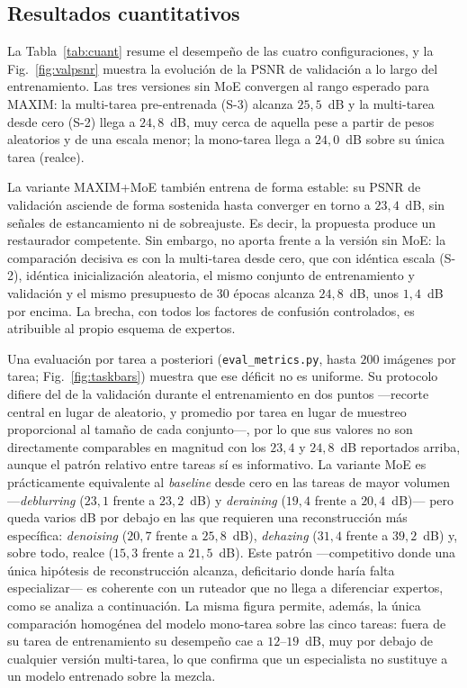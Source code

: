 \documentclass[aps,prl,twocolumn,groupedaddress]{revtex4-2}
\begin{document}
\subsection{Resultados cuantitativos}

La Tabla~\ref{tab:cuant} resume el desempeño de las cuatro configuraciones, y la Fig.~\ref{fig:valpsnr} muestra la evolución de la PSNR de validación a lo largo del entrenamiento. Las tres versiones sin MoE convergen al rango esperado para MAXIM: la multi-tarea pre-entrenada (S-3) alcanza $25{,}5$~dB y la multi-tarea desde cero (S-2) llega a $24{,}8$~dB, muy cerca de aquella pese a partir de pesos aleatorios y de una escala menor; la mono-tarea llega a $24{,}0$~dB sobre su única tarea (realce).

La variante MAXIM+MoE también entrena de forma estable: su PSNR de validación asciende de forma sostenida hasta converger en torno a $23{,}4$~dB, sin señales de estancamiento ni de sobreajuste. Es decir, la propuesta produce un restaurador competente. Sin embargo, no aporta frente a la versión sin MoE: la comparación decisiva es con la multi-tarea desde cero, que con idéntica escala (S-2), idéntica inicialización aleatoria, el mismo conjunto de entrenamiento y validación y el mismo presupuesto de $30$ épocas alcanza $24{,}8$~dB, unos $1{,}4$~dB por encima. La brecha, con todos los factores de confusión controlados, es atribuible al propio esquema de expertos.

Una evaluación por tarea a posteriori (\texttt{eval\_metrics.py}, hasta $200$ imágenes por tarea; Fig.~\ref{fig:taskbars}) muestra que ese déficit no es uniforme. Su protocolo difiere del de la validación durante el entrenamiento en dos puntos ---recorte central en lugar de aleatorio, y promedio por tarea en lugar de muestreo proporcional al tamaño de cada conjunto---, por lo que sus valores no son directamente comparables en magnitud con los $23{,}4$ y $24{,}8$~dB reportados arriba, aunque el patrón relativo entre tareas sí es informativo. La variante MoE es prácticamente equivalente al \textit{baseline} desde cero en las tareas de mayor volumen ---\textit{deblurring} ($23{,}1$ frente a $23{,}2$~dB) y \textit{deraining} ($19{,}4$ frente a $20{,}4$~dB)--- pero queda varios dB por debajo en las que requieren una reconstrucción más específica: \textit{denoising} ($20{,}7$ frente a $25{,}8$~dB), \textit{dehazing} ($31{,}4$ frente a $39{,}2$~dB) y, sobre todo, realce ($15{,}3$ frente a $21{,}5$~dB). Este patrón ---competitivo donde una única hipótesis de reconstrucción alcanza, deficitario donde haría falta especializar--- es coherente con un ruteador que no llega a diferenciar expertos, como se analiza a continuación. La misma figura permite, además, la única comparación homogénea del modelo mono-tarea sobre las cinco tareas: fuera de su tarea de entrenamiento su desempeño cae a $12$--$19$~dB, muy por debajo de cualquier versión multi-tarea, lo que confirma que un especialista no sustituye a un modelo entrenado sobre la mezcla.
\end{document}
